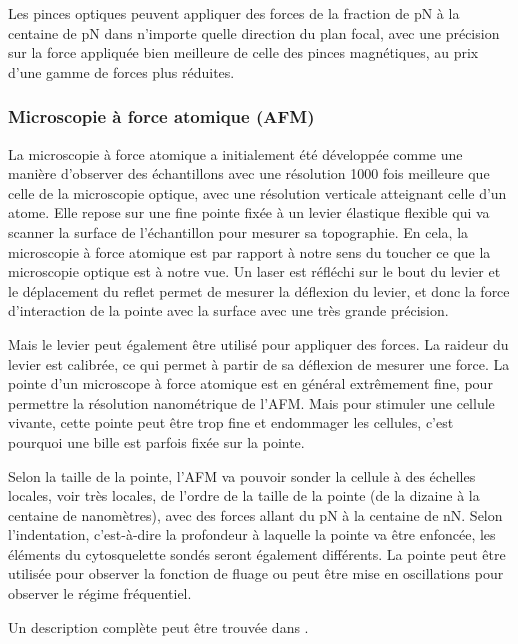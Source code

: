 Les pinces optiques peuvent appliquer des forces de la fraction de pN  à la centaine de pN dans n'importe quelle direction du plan focal, avec une précision sur la force appliquée bien meilleure de celle des pinces magnétiques, au prix d'une gamme de forces plus réduites. 

\subsubsection{Microscopie à force atomique (AFM)}

La microscopie à force atomique a initialement été développée comme une manière d'observer des échantillons avec une résolution 1000 fois meilleure que celle de la microscopie optique, avec une résolution verticale atteignant celle d'un atome. 
Elle repose sur une fine pointe fixée à un levier élastique flexible qui va scanner la surface de l'échantillon pour mesurer sa topographie. En cela, la microscopie à force atomique est par rapport à notre sens du toucher ce que la microscopie optique est à notre vue. Un laser est réfléchi sur le bout du levier et le déplacement du reflet permet de mesurer la déflexion du levier, et donc la force d'interaction de la pointe avec la surface avec une très grande précision. 

Mais le levier peut également être utilisé pour appliquer des forces. La raideur du levier est calibrée, ce qui permet à partir de sa déflexion de mesurer une force. 
La pointe d'un microscope à force atomique est en général extrêmement fine, pour permettre la résolution nanométrique de l'AFM. Mais pour stimuler une cellule vivante, cette pointe peut être trop fine et endommager les cellules, c'est pourquoi une bille est parfois fixée sur la pointe.

Selon la taille de la pointe, l'AFM va pouvoir sonder la cellule à des échelles locales, voir très locales, de l'ordre de la taille de la pointe (de la dizaine à la centaine de nanomètres), avec des forces allant du pN à la centaine de nN. Selon l'indentation, c'est-à-dire la profondeur à laquelle la pointe va être enfoncée, les éléments du cytosquelette sondés seront également différents. 
La pointe peut être utilisée pour observer la fonction de fluage ou peut être mise en oscillations pour observer le régime fréquentiel. 

Un description complète peut être trouvée dans \cite{gautier_atomic_2015}. 

